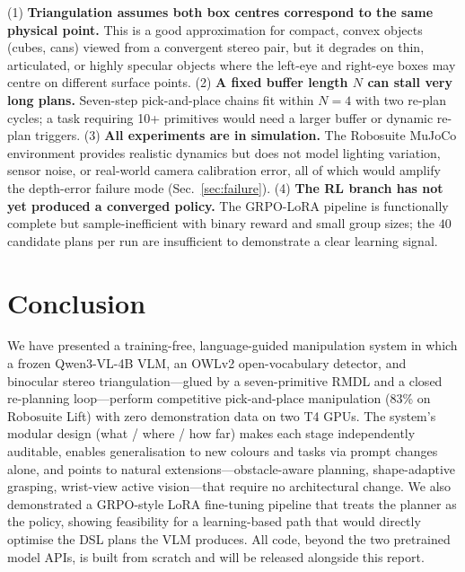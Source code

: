 \documentclass[conference]{IEEEtran}
\begin{document}
(1) \textbf{Triangulation assumes both box centres correspond to the same physical point.} This is a good approximation for compact, convex objects (cubes, cans) viewed from a convergent stereo pair, but it degrades on thin, articulated, or highly specular objects where the left-eye and right-eye boxes may centre on different surface points. (2) \textbf{A fixed buffer length $N$ can stall very long plans.} Seven-step pick-and-place chains fit within $N=4$ with two re-plan cycles; a task requiring 10+ primitives would need a larger buffer or dynamic re-plan triggers. (3) \textbf{All experiments are in simulation.} The Robosuite MuJoCo environment provides realistic dynamics but does not model lighting variation, sensor noise, or real-world camera calibration error, all of which would amplify the depth-error failure mode (Sec.~\ref{sec:failure}). (4) \textbf{The RL branch has not yet produced a converged policy.} The GRPO-LoRA pipeline is functionally complete but sample-inefficient with binary reward and small group sizes; the $40$ candidate plans per run are insufficient to demonstrate a clear learning signal.

\section{Conclusion}
\label{sec:conclusion}

We have presented a training-free, language-guided manipulation system in which a frozen Qwen3-VL-4B VLM, an OWLv2 open-vocabulary detector, and binocular stereo triangulation---glued by a seven-primitive RMDL and a closed re-planning loop---perform competitive pick-and-place manipulation (83\% on Robosuite Lift) with zero demonstration data on two T4 GPUs. The system's modular design (what / where / how far) makes each stage independently auditable, enables generalisation to new colours and tasks via prompt changes alone, and points to natural extensions---obstacle-aware planning, shape-adaptive grasping, wrist-view active vision---that require no architectural change. We also demonstrated a GRPO-style LoRA fine-tuning pipeline that treats the planner as the policy, showing feasibility for a learning-based path that would directly optimise the DSL plans the VLM produces. All code, beyond the two pretrained model APIs, is built from scratch and will be released alongside this report.

\end{document}
